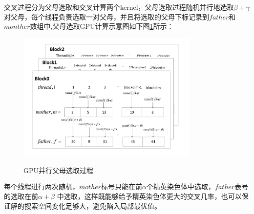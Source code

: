 交叉过程分为父母选取和交叉计算两个kernel，父母选取过程随机并行地选取$\beta+\gamma$对父母，每个线程负责选取一对父母，并且将选取的父母下标记录到$father$和$monther$数组中,父母选取GPU计算示意图如下图\ref{pp}所示：
\begin{figure}
  \begin{center}
    {\includegraphics[width=0.8\textwidth]{figures/GPUchoose.pdf}}
    \end{center}
  \caption{{\footnotesize{GPU并行父母选取过程}}}
  \label{pp}
\end{figure}
每个线程进行两次随机，$mother$标号只能在前$\alpha$个精英染色体中选取，$father$表号的选取在前$\alpha+\beta$ 中选取，这样既能够给予精英染色体更大的交叉几率，也可以保证解的搜索空间变化足够大，避免陷入局部最优值。

